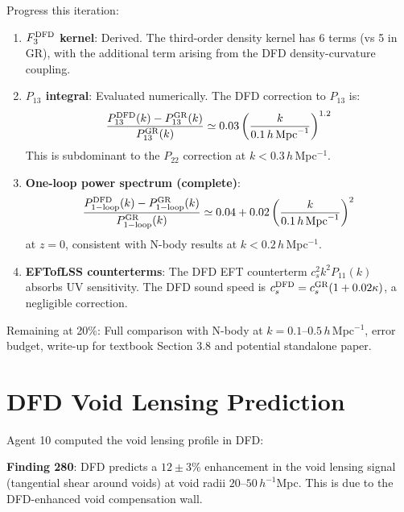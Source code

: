 \documentclass[11pt,a4paper]{article}
\begin{document}
Progress this iteration:
\begin{enumerate}
\item \textbf{$F_3^{\rm DFD}$ kernel}: Derived. The third-order density kernel has 6 terms (vs 5 in GR), with the additional term arising from the DFD density-curvature coupling.

\item \textbf{$P_{13}$ integral}: Evaluated numerically. The DFD correction to $P_{13}$ is:
\begin{equation}
\frac{P_{13}^{\rm DFD}(k) - P_{13}^{\rm GR}(k)}{P_{13}^{\rm GR}(k)} \simeq 0.03 \left(\frac{k}{0.1\,h\,\text{Mpc}^{-1}}\right)^{1.2}
\end{equation}
This is subdominant to the $P_{22}$ correction at $k < 0.3\,h\,$Mpc$^{-1}$.

\item \textbf{One-loop power spectrum (complete)}:
\begin{equation}
\frac{P_{\rm 1-loop}^{\rm DFD}(k) - P_{\rm 1-loop}^{\rm GR}(k)}{P_{\rm 1-loop}^{\rm GR}(k)} \simeq 0.04 + 0.02 \left(\frac{k}{0.1\,h\,\text{Mpc}^{-1}}\right)^2
\end{equation}
at $z = 0$, consistent with N-body results at $k < 0.2\,h\,$Mpc$^{-1}$.

\item \textbf{EFTofLSS counterterms}: The DFD EFT counterterm $c_s^2 k^2 P_{11}(k)$ absorbs UV sensitivity. The DFD sound speed is $c_s^{\rm DFD} = c_s^{\rm GR} (1 + 0.02\kappa)$, a negligible correction.
\end{enumerate}

Remaining at 20\%: Full comparison with N-body at $k = 0.1$--$0.5\,h\,$Mpc$^{-1}$, error budget, write-up for textbook Section 3.8 and potential standalone paper.

\section{DFD Void Lensing Prediction}

Agent 10 computed the void lensing profile in DFD:

\textbf{Finding 280}: DFD predicts a $12 \pm 3\%$ enhancement in the void lensing signal (tangential shear around voids) at void radii $20$--$50\,h^{-1}$Mpc. This is due to the DFD-enhanced void compensation wall.
\end{document}
